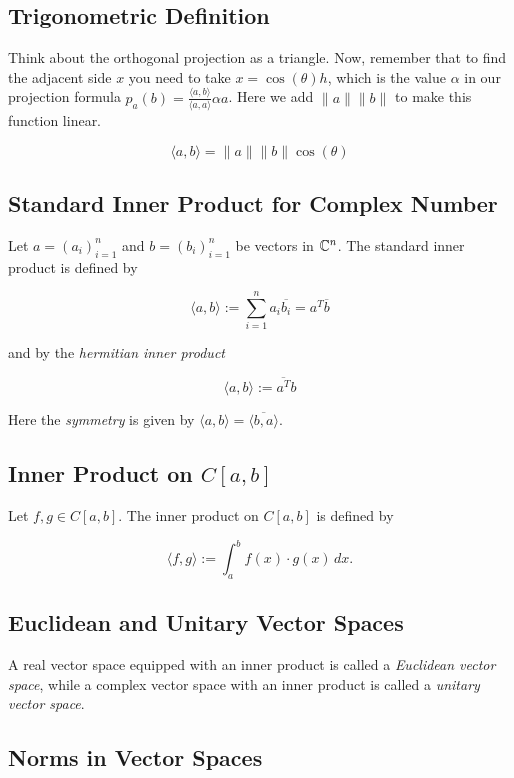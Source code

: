 \subsection{Trigonometric Definition}

Think about the orthogonal projection as a triangle. Now, remember that to find the adjacent side \(x\) 
you need to take \(x = \cos(\theta)h\), which is the value \(\alpha\) in our projection formula 
\(p_a (b) = \frac{\langle a, b\rangle}{\langle a, a\rangle} \alpha a\). 
Here we add \(\|a\|\|b\|\) to make this function linear.

\[
    \langle a, b \rangle = \|a\| \|b\| \cos (\theta)
\]

\subsection{Standard Inner Product for Complex Number}

Let \( a = {(a_i)}_{i=1}^n \) and \( b = {(b_i)}_{i=1}^n \) be vectors in \( \mathbb{C}^n \). The standard 
inner product is defined by

\[
    \langle a, b \rangle := \sum_{i=1}^n a_i \overline{b_i} = a^T \overline{b}
\]

and by the \emph{hermitian inner product}

\[
   \langle a, b \rangle := \overline{a^{T}} b
\]

Here the \emph{symmetry} is given by \(\langle a, b \rangle = \overline{\langle b, a \rangle}\).

\subsection{Inner Product on \texorpdfstring{\( C[a, b] \)}{}}

Let \( f, g \in C[a, b] \). The inner product on \( C[a, b] \) is defined by

\[
    \langle f, g \rangle := \int_a^b f(x) \cdot g(x) \, dx.
\]

\subsection{Euclidean and Unitary Vector Spaces}

A real vector space equipped with an inner product is called a \emph{Euclidean vector space}, while a 
complex vector space with an inner product is called a \emph{unitary vector space}.

\subsection{Norms in Vector Spaces}


